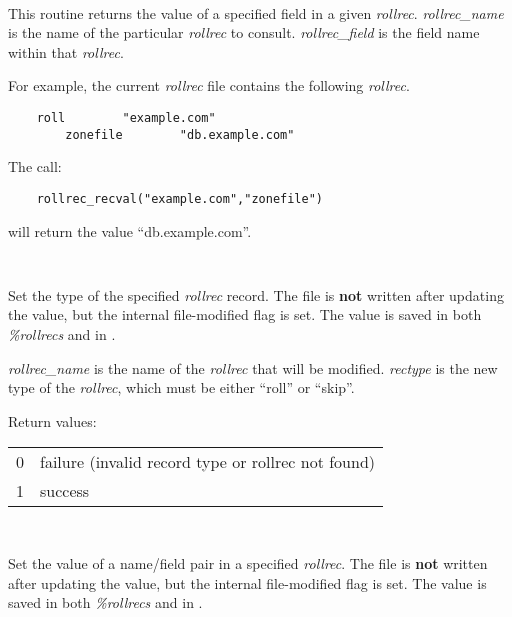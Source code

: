 \begin{description}
\item {}\verb" "

This routine returns the value of a specified field in a given {\it rollrec}.
{\it rollrec\_name} is the name of the particular {\it rollrec} to consult.
{\it rollrec\_field} is the field name within that {\it rollrec}.

For example, the current {\it rollrec} file contains the following {\it
rollrec}.

\begin{verbatim}
    roll        "example.com"
        zonefile        "db.example.com"
\end{verbatim}

The call:

\begin{verbatim}
    rollrec_recval("example.com","zonefile")
\end{verbatim}

will return the value ``db.example.com''.

\item {}\verb" "

Set the type of the specified {\it rollrec} record.  The file is {\bf not}
written after updating the value, but the internal file-modified flag is set.
The value is saved in both {\it \%rollrecs} and in {\it \@rollreclines}.

{\it rollrec\_name} is the name of the {\it rollrec} that will be modified.
{\it rectype} is the new type of the {\it rollrec}, which must be either
``roll'' or ``skip''.

Return values:

\begin{table}[ht]
\begin{center}
\begin{tabular}{cl}
0 & failure (invalid record type or rollrec not found)	\\
1 & success						\\
\end{tabular} 
\end{center}
\end{table}

\item {}\verb" "

Set the value of a name/field pair in a specified {\it rollrec}.  The file is
{\bf not} written after updating the value, but the internal file-modified
flag is set.  The value is saved in both {\it \%rollrecs} and in {\it
\@rollreclines}.


\end{description}
